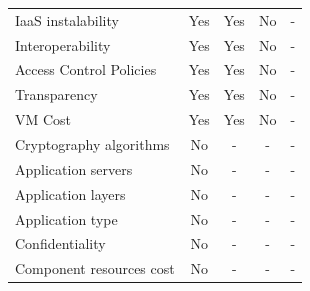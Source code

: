 \documentclass[conference]{IEEEtran}
\begin{document}
\begin{table}[]
\begin{tabular}{@{}lcccc@{}}
IaaS instalability                           & Yes                                     & Yes                                     & \cellcolor[HTML]{EA9999}No             & \cellcolor[HTML]{EA9999}-   \\
Interoperability                                & Yes                                     & Yes                                     & \cellcolor[HTML]{EA9999}No             & \cellcolor[HTML]{EA9999}-   \\
Access Control Policies                   & Yes                                     & Yes                                     & \cellcolor[HTML]{EA9999}No             & \cellcolor[HTML]{EA9999}-   \\
Transparency                                     & Yes                                     & Yes                                     & \cellcolor[HTML]{EA9999}No             & \cellcolor[HTML]{EA9999}-   \\
VM Cost                                       & Yes                                     & Yes                                     & \cellcolor[HTML]{EA9999}No             & \cellcolor[HTML]{EA9999}-   \\
Cryptography algorithms                        & \cellcolor[HTML]{EA9999}No             & \cellcolor[HTML]{EA9999}-               & \cellcolor[HTML]{EA9999}-               & \cellcolor[HTML]{EA9999}-   \\
Application servers                           & \cellcolor[HTML]{EA9999}No             & \cellcolor[HTML]{EA9999}-               & \cellcolor[HTML]{EA9999}-               & \cellcolor[HTML]{EA9999}-   \\
Application layers                              & \cellcolor[HTML]{EA9999}No             & \cellcolor[HTML]{EA9999}-               & \cellcolor[HTML]{EA9999}-               & \cellcolor[HTML]{EA9999}-   \\
Application type                                 & \cellcolor[HTML]{EA9999}No             & \cellcolor[HTML]{EA9999}-               & \cellcolor[HTML]{EA9999}-               & \cellcolor[HTML]{EA9999}-   \\
Confidentiality                                 & \cellcolor[HTML]{EA9999}No             & \cellcolor[HTML]{EA9999}-               & \cellcolor[HTML]{EA9999}-               & \cellcolor[HTML]{EA9999}-   \\
Component resources cost                  & \cellcolor[HTML]{EA9999}No             & \cellcolor[HTML]{EA9999}-               & \cellcolor[HTML]{EA9999}-               & \cellcolor[HTML]{EA9999}-   \\

\end{tabular}
\end{table}
\end{document}
